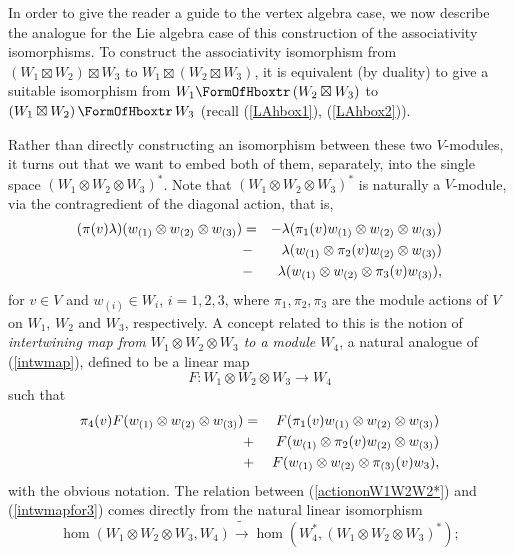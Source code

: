 \documentclass[12pt]{article}
\begin{document}
In order to give the reader a guide to the vertex algebra case, we now
describe the analogue for the Lie algebra case of this construction of
the associativity isomorphisms.  To construct the associativity
isomorphism {}from $(W_1 \boxtimes W_2)\boxtimes W_3$ to $W_1\boxtimes
(W_2\boxtimes W_3)$, it is equivalent (by duality) to give a suitable
isomorphism {}from $W_1\hboxtr\, (W_2\boxtimes W_3)$ to $(W_1 \boxtimes
W_2)\, \hboxtr\, W_3$ (recall (\ref{LAhbox1}), (\ref{LAhbox2})).

Rather than directly constructing an isomorphism between these two
$V$-modules, it turns out that we want to embed both of them,
separately, into the single space $(W_1\otimes W_2 \otimes W_3)^*$.
Note that $(W_1\otimes W_2 \otimes W_3)^*$
is naturally a $V$-module, via the contragredient of the
diagonal action, that is,
\begin{eqnarray}\label{actiononW1W2W2*}
(\pi(v)\lambda)(w_{(1)}\otimes w_{(2)}\otimes w_{(3)})&=&
-\lambda(\pi_1(v)w_{(1)}\otimes w_{(2)}\otimes w_{(3)})\nonumber\\
& -&\lambda(w_{(1)}\otimes \pi_2(v)w_{(2)}\otimes w_{(3)})\nonumber\\
& -&\lambda(w_{(1)}\otimes w_{(2)}\otimes \pi_3(v)w_{(3)}),
\end{eqnarray}
for $v\in V$ and $w_{(i)}\in W_i$, $i=1,2,3$, where $\pi_1, \pi_2,
\pi_3$ are the module actions of $V$ on $W_1$, $W_2$ and $W_3$,
respectively.  A concept related to this is the notion of
{\it intertwining map {}from $W_1 \otimes W_2 \otimes W_3$ to a module
$W_4$}, a natural analogue of (\ref{intwmap}), defined to be a linear map
\begin{equation}\label{intwmap3}
F: W_1\otimes W_2 \otimes W_3 \longrightarrow W_4
\end{equation}
such that
\begin{eqnarray}\label{intwmapfor3} \pi_4(v)F(w_{(1)}\otimes w_{(2)}
\otimes w_{(3)})&=&F(\pi_1(v)w_{(1)} \otimes w_{(2)} \otimes
w_{(3)})\nonumber\\ &+&F(w_{(1)} \otimes \pi_2(v)w_{(2)} \otimes
w_{(3)})\nonumber\\ &+&F(w_{(1)} \otimes w_{(2)} \otimes
\pi_{(3)}(v)w_3),\label{11i}
\end{eqnarray}
with the obvious notation.  The
relation between (\ref{actiononW1W2W2*}) and (\ref{intwmapfor3})
comes directly {}from the natural linear isomorphism
\begin{equation}
\hom (W_1\otimes W_2\otimes W_3, W_4) \tilde{\longrightarrow} \hom
(W^*_4, (W_1\otimes W_2\otimes W_3)^*);
\end{equation}
\end{document}
